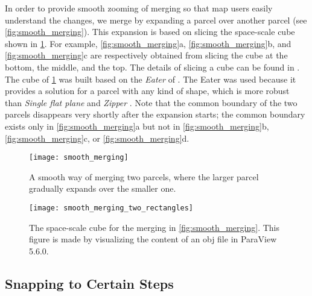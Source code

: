 \documentclass[ijgi,article,submit,moreauthors,pdftex]{Definitions/mdpi}
\begin{document}
In order to provide smooth zooming of merging
so that map users easily understand the changes,
we merge by expanding a parcel over another parcel
(see \fig\ref{fig:smooth_merging}).
This expansion is based on slicing the space-scale cube shown in
\fig\ref{fig:smooth_merging_two_rectangles}.
For example, \figs\ref{fig:smooth_merging}a,
\ref{fig:smooth_merging}b, and \ref{fig:smooth_merging}c
are respectively obtained from slicing the cube 
at the bottom, the middle, and the top.
The details of slicing a cube can be found in \citet{Meijers2020Web}.
The cube of \fig\ref{fig:smooth_merging_two_rectangles} was built 
based on the \emph{Eater} of \citet{Suba2014Merge}.
The Eater was used because it provides a solution 
for a parcel with any kind of shape, which is more robust than
\emph{Single flat plane} and \emph{Zipper} \citep{Suba2014Merge}.
Note that the common boundary of the two parcels disappears
very shortly after the expansion starts;
the common boundary exists only in \fig\ref{fig:smooth_merging}a but not in
\fig\ref{fig:smooth_merging}b,
\fig\ref{fig:smooth_merging}c, or
\fig\ref{fig:smooth_merging}d.


\begin{figure}[tb]
\centering
\texttt{[image: smooth\_merging]}
\caption{A smooth way of merging two parcels,
    where the larger parcel gradually expands over the smaller one.}
\label{fig:smooth_merging}
%
\vspace{6mm}
%
\centering
\texttt{[image: smooth\_merging\_two\_rectangles]}
\caption{The space-scale cube for the merging 
    in \fig\ref{fig:smooth_merging}.
    This figure is made by visualizing the content of an obj file in 
    ParaView 5.6.0.}
\label{fig:smooth_merging_two_rectangles}
\end{figure}




\subsection{Snapping to Certain Steps}
\label{sec:snap}
\end{document}
